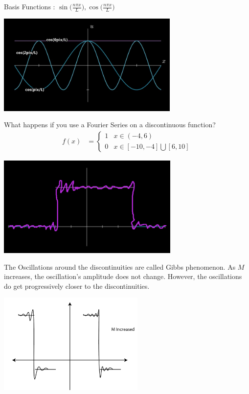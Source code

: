 \documentclass{article}
\newcommand{\FS}{\sin \Big( \frac{n \pi x}{L} \Big)}
\newcommand{\FC}{\cos \Big( \frac{n \pi x}{L} \Big)}
\begin{document}
  Basis Functions : $\FS, \FC$
  \begin{center}
    \includegraphics[height=5cm]{Fourier Basis Functions}
  \end{center}

  What happens if you use a Fourier Series on a discontinuous function?
  \begin{align}
    f(x) & =
    \begin{cases}
      1 & x \in (-4, 6)\\
      0 & x \in [-10, -4] \bigcup [6, 10]
    \end{cases}
  \end{align}

  \begin{center}
    \includegraphics[height=5cm]{Fourier Finite Fourier Series}
  \end{center}

  The Oscillations around the discontinuities are called Gibbs phenomenon. As $M$ increases, the oscillation's amplitude does not change. However, the oscillations do get progressively closer to the discontinuities.

  \begin{center}
    \includegraphics[height=5cm]{Fourier M}
  \end{center}
\end{document}
